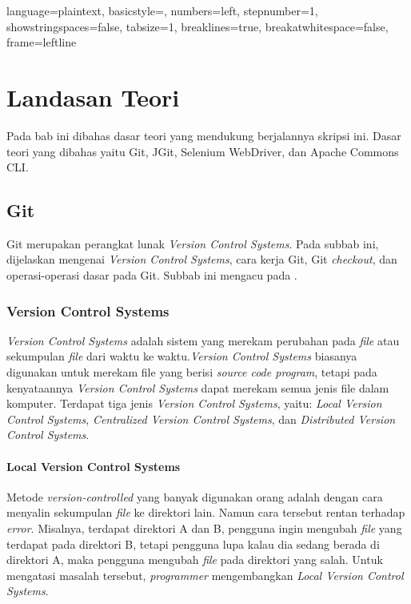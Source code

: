 

\lstset
{ 
    language=plaintext,
    basicstyle=\footnotesize,
    numbers=left,
    stepnumber=1,
    showstringspaces=false,
    tabsize=1,
    breaklines=true,
    breakatwhitespace=false,
    frame=leftline
}



\chapter{Landasan Teori}
\label{chap:teori}

Pada bab ini dibahas dasar teori yang mendukung berjalannya skripsi ini. Dasar teori yang dibahas yaitu Git, JGit, Selenium WebDriver, dan Apache Commons CLI.

\section{Git}
\label{sec:git} 
Git merupakan perangkat lunak \textit{Version Control Systems}. Pada subbab ini, dijelaskan mengenai \textit{Version Control Systems}, cara kerja Git, Git \textit{checkout}, dan operasi-operasi dasar pada Git. Subbab ini mengacu pada \cite{chacon2014pro}.   

\subsection{Version Control Systems}
\label{subsec:vcs}
\textit{Version Control Systems} adalah sistem yang merekam perubahan pada \textit{file} atau sekumpulan \textit{file} dari waktu ke waktu.\textit{Version Control Systems} biasanya digunakan  untuk merekam file yang berisi \textit{source code program}, tetapi pada kenyataannya \textit{Version Control Systems} dapat merekam semua jenis file dalam komputer. Terdapat tiga jenis \textit{Version Control Systems}, yaitu: \textit{Local Version Control Systems}, \textit{Centralized Version Control Systems}, dan \textit{Distributed Version Control Systems}.

\subsubsection{Local Version Control Systems}
Metode \textit{version-controlled} yang banyak digunakan orang adalah dengan cara menyalin sekumpulan \textit{file} ke direktori lain. Namun cara tersebut rentan terhadap \textit{error}.
Misalnya, terdapat direktori A dan B, pengguna ingin mengubah \textit{file} yang terdapat pada direktori B, tetapi pengguna lupa kalau dia sedang berada di direktori A, maka pengguna mengubah \textit{file} pada direktori yang salah. Untuk mengatasi masalah tersebut, \textit{programmer} mengembangkan \textit{Local Version Control Systems}. 


